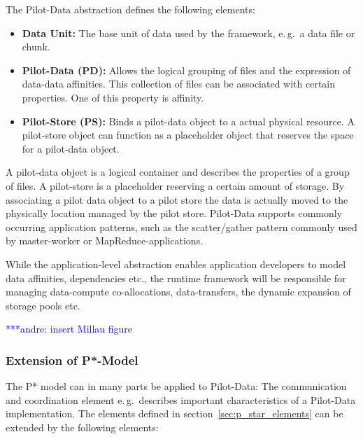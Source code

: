 \documentclass[conference,final]{IEEEtran}
\newcommand{\alnote}[1]{ {\textcolor{blue} { ***andre: #1 }}}
\newcommand{\alnote}[1]{}
\begin{document}
The Pilot-Data abstraction defines the following elements:
\begin{itemize}
    \item \textbf{Data Unit:} The base unit of data used by the framework, e.\,g.\ a data 
    file or chunk.
    \item \textbf{Pilot-Data (PD):} Allows the logical grouping of files and the 
expression of data-data affinities. This collection of files can be associated with certain properties. One of this property is affinity.    
    \item \textbf{Pilot-Store (PS):} Binds a pilot-data object to a actual physical resource. A pilot-store object can function as a placeholder object that reserves the space for a pilot-data object.
\end{itemize}

A pilot-data object is a logical container and describes the properties of a 
group of files. A pilot-store is a placeholder reserving a certain amount of 
storage. By associating a pilot data object to a pilot store the data is 
actually moved to the physically location managed by the pilot store.
Pilot-Data supports commonly occurring application patterns, such as the 
scatter/gather pattern commonly used by  master-worker or 
MapReduce-applications.

While the application-level abstraction enables application developers to model 
data affinities, dependencies etc., the runtime framework will be responsible 
for managing data-compute co-allocations, data-transfers, the dynamic expansion of storage pools etc. 

\alnote{insert Millau figure}

\subsubsection{Extension of P*-Model}

The P* model can in many parts be applied to Pilot-Data: The communication and
coordination element e.\,g.\ describes important characteristics of a Pilot-Data
implementation. The elements defined in section~\ref{sec:p_star_elements} can be
extended by the following elements:
\end{document}

